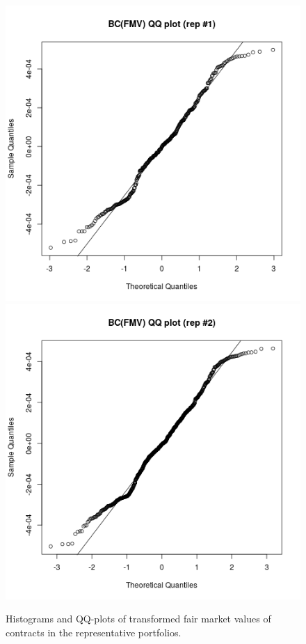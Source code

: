 \begin{figure}[h!]
{\includegraphics[scale=0.4]{pictures/boxcox_rep1_transformed_fmv_qqplot}\includegraphics[scale=0.4]{pictures/boxcox_rep2_transformed_fmv_qqplot} 
}
\caption{Histograms and QQ-plots of transformed fair market values of contracts in the representative portfolios.}\label{qqplot_transformed_fmv}
\end{figure}


